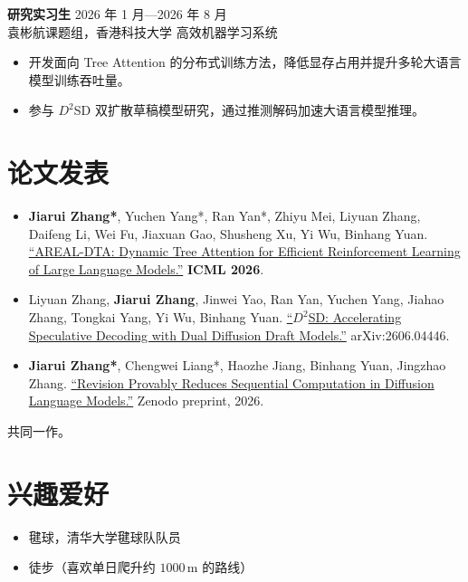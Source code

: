 \documentclass[11pt,a4paper]{article}
\newcommand{\entry}[4]{%
  \textbf{#1} \hfill {\small #2}\\[-1pt]
  #3 \hfill {\small #4}%
}
\begin{document}
\entry{研究实习生}{2026 年 1 月—2026 年 8 月}{袁彬航课题组，香港科技大学}{高效机器学习系统}
\begin{itemize}
  \item 开发面向 Tree Attention 的分布式训练方法，降低显存占用并提升多轮大语言模型训练吞吐量。
  \item 参与 $D^2$SD 双扩散草稿模型研究，通过推测解码加速大语言模型推理。
\end{itemize}

\section*{论文发表}
\begin{itemize}
  \item \textbf{Jiarui Zhang*}, Yuchen Yang*, Ran Yan*, Zhiyu Mei, Liyuan Zhang, Daifeng Li, Wei Fu, Jiaxuan Gao, Shusheng Xu, Yi Wu, Binhang Yuan. \href{https://arxiv.org/abs/2602.00482}{``AREAL-DTA: Dynamic Tree Attention for Efficient Reinforcement Learning of Large Language Models.''} \textbf{ICML 2026}.
  \item Liyuan Zhang, \textbf{Jiarui Zhang}, Jinwei Yao, Ran Yan, Yuchen Yang, Jiahao Zhang, Tongkai Yang, Yi Wu, Binhang Yuan. \href{https://arxiv.org/abs/2606.04446}{``$D^2$SD: Accelerating Speculative Decoding with Dual Diffusion Draft Models.''} arXiv:2606.04446.
  \item \textbf{Jiarui Zhang*}, Chengwei Liang*, Haozhe Jiang, Binhang Yuan, Jingzhao Zhang. \href{https://zenodo.org/records/23105365}{``Revision Provably Reduces Sequential Computation in Diffusion Language Models.''} Zenodo preprint, 2026.
\end{itemize}
{\footnotesize * 共同一作。}

\section*{兴趣爱好}
\begin{itemize}
  \item 毽球，清华大学毽球队队员
  \item 徒步（喜欢单日爬升约 $1000\,\mathrm{m}$ 的路线）
\end{itemize}
\end{document}
